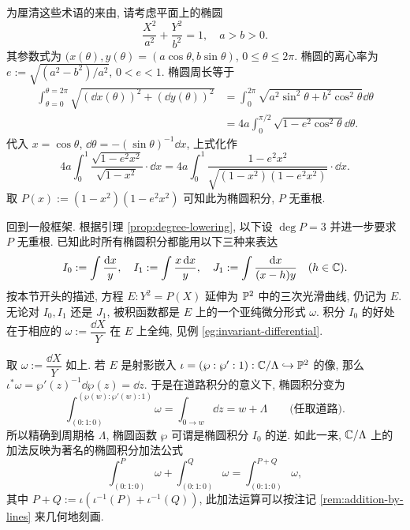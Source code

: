 \begin{example}
	为厘清这些术语的来由, 请考虑平面上的椭圆
	\[ \dfrac{X^2}{a^2} + \dfrac{Y^2}{b^2} = 1, \quad a > b > 0. \]
	其参数式为 $(x(\theta), y(\theta) = (a\cos\theta, b\sin\theta)$, $0 \leq \theta \leq 2\pi$. 椭圆的离心率为 $e := \sqrt{(a^2 - b^2)/a^2}$, $0 < e < 1$. 椭圆周长等于
	\begin{align*}
		\int_{\theta=0}^{\theta=2\pi} \sqrt{(\dd x(\theta))^2 + (\dd y(\theta))^2} & = \int_0^{2\pi} \sqrt{ a^2\sin^2 \theta + b^2 \cos^2\theta } \dd\theta \\
		& = 4a \int_0^{\pi/2} \sqrt{1 - e^2 \cos^2\theta} \dd\theta.
	\end{align*}
	代入 $x = \cos\theta$, $\dd\theta = -(\sin\theta)^{-1} \dd x$, 上式化作
	\[ 4a \int_0^1 \dfrac{ \sqrt{1 - e^2 x^2} }{\sqrt{1 - x^2}} \cdot \dd x = 4a \int_0^1 \dfrac{ 1 - e^2 x^2 }{ \sqrt{(1 - x^2)(1 - e^2 x^2)} } \cdot \dd x. \]
	取 $P(x) := (1 - x^2)(1 - e^2 x^2)$ 可知此为椭圆积分, $P$ 无重根.
\end{example}

回到一般框架. 根据引理 \ref{prop:degree-lowering}, 以下设 $\deg P = 3$ 并进一步要求 $P$ 无重根. 已知此时所有椭圆积分都能用以下三种来表达
\[ I_0 := \int \dfrac{\mathop{}\!\mathrm{d} x}{y}, \quad I_1 := \int \dfrac{x \mathop{}\!\mathrm{d} x}{y}, \quad J_1 := \int \dfrac{\mathop{}\!\mathrm{d} x}{(x-h)y} \quad (h \in \mathbb{C}). \]
按本节开头的描述, 方程 $E: Y^2 = P(X)$ 延伸为 $\mathbb{P}^2$ 中的三次光滑曲线, 仍记为 $E$. 无论对 $I_0, I_1$ 还是 $J_1$, 被积函数都是 $E$ 上的一个亚纯微分形式 $\omega$. 积分 $I_0$ 的好处在于相应的 $\omega := \dfrac{\dd X}{Y}$ 在 $E$ 上全纯, 见例 \ref{eg:invariant-differential}.

取 $\omega := \dfrac{\dd X}{Y}$ 如上. 若 $E$ 是射影嵌入 $\iota = (\wp:\wp':1): \mathbb{C}/\Lambda \hookrightarrow \mathbb{P}^2$ 的像, 那么 $\iota^* \omega = \wp'(z)^{-1} \dd \wp(z) = \dd z$. 于是在道路积分的意义下, 椭圆积分变为
\[ \int_{(0:1:0)}^{(\wp(w): \wp'(w): 1)} \omega = \int_{0 \to w} \dd z = w + \Lambda \qquad \text{(任取道路)}. \]
所以精确到周期格 $\Lambda$, 椭圆函数 $\wp$ 可谓是椭圆积分 $I_0$ 的逆. 如此一来, $\mathbb{C}/\Lambda$ 上的加法反映为著名的椭圆积分加法公式
\[ \int_{(0:1:0)}^P \omega + \int_{(0:1:0)}^Q \omega = \int_{(0:1:0)}^{P+Q} \omega, \]
其中 $P+Q := \iota\left( \iota^{-1}(P) + \iota^{-1}(Q)\right)$, 此加法运算可以按注记 \ref{rem:addition-by-lines} 来几何地刻画.

